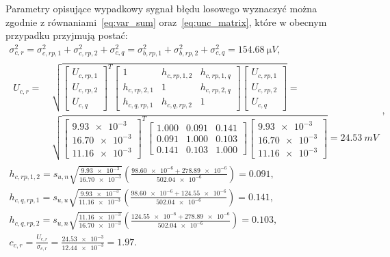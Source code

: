 Parametry opisujące wypadkowy sygnał błędu losowego wyznaczyć można zgodnie z równaniami~\eqref{eq:var_sum} oraz~\eqref{eq:unc_matrix}, które w obecnym przypadku przyjmują postać:
\begin{gather}
\sigma_{c,r}^{2} = \sigma_{c,rp,1}^{2} + \sigma_{c,rp,2}^{2} + \sigma_{c,q}^{2} = \sigma_{b,rp,1}^{2} + \sigma_{b,rp,2}^{2} + \sigma_{c,q}^{2} = \qty{154.68}{\micro V} \label{eq:sym_partc_rand_var}, \\
\begin{split}
U_{c,r} = ~ & \sqrt{
\begin{bmatrix}
U_{c,rp,1} \\ U_{c,rp,2} \\ U_{c,q}
\end{bmatrix}^{T}
\begin{bmatrix}
1            & h_{c,rp,1,2} & h_{c,rp,1,q} \\
h_{c,rp,2,1} & 1            & h_{c,rp,2,q} \\
h_{c,q,rp,1} & h_{c,q,rp,2} & 1
\end{bmatrix}
\begin{bmatrix}
U_{c,rp,1} \\ U_{c,rp,2} \\ U_{c,q}
\end{bmatrix}} = ~ \\ & \sqrt{
\begin{bmatrix}
\num{9.93e-3} \\ \num{16.70e-3} \\ \num{11.16e-3}
\end{bmatrix}^{T}
\begin{bmatrix}
\num{1.000} & \num{0.091} & \num{0.141} \\
\num{0.091} & \num{1.000} & \num{0.103} \\
\num{0.141} & \num{0.103} & \num{1.000}
\end{bmatrix}
\begin{bmatrix}
\num{9.93e-3} \\ \num{16.70e-3} \\ \num{11.16e-3}
\end{bmatrix}} = \qty{24.53}{mV}
\end{split}
\label{eq:sym_partc_rand_uncert}, \\
h_{c,rp,1,2} = s_{u,n} \sqrt{\frac{\num{9.93e-3}}{\num{16.70e-3}}} \left( \frac{\num{98.60e-6} + \num{278.89e-6}}{\num{502.04e-6}} \right) = \num{0.091} \label{eq:sym_partc_coher_rp_1_2}, \\
h_{c,q,rp,1} = s_{u,u} \sqrt{\frac{\num{9.93e-3}}{\num{11.16e-3}}} \left( \frac{\num{98.60e-6} + \num{124.55e-6}}{\num{502.04e-6}} \right) = \num{0.141} \label{eq:sym_partc_coher_q_rp_1}, \\
h_{c,q,rp,2} = s_{u,n} \sqrt{\frac{\num{11.16e-3}}{\num{16.70e-3}}} \left( \frac{\num{124.55e-6} + \num{278.89e-6}}{\num{502.04e-6}} \right) = \num{0.103} \label{eq:sym_partc_coher_q_rp_2}, \\
c_{c,r} = \frac{U_{c,r}}{\sigma_{c,r}} = \frac{\num{24.53e-3}}{\num{12.44e-3}} = \num{1.97} \label{eq:sym_partc_rand_factor}.
\end{gather}

